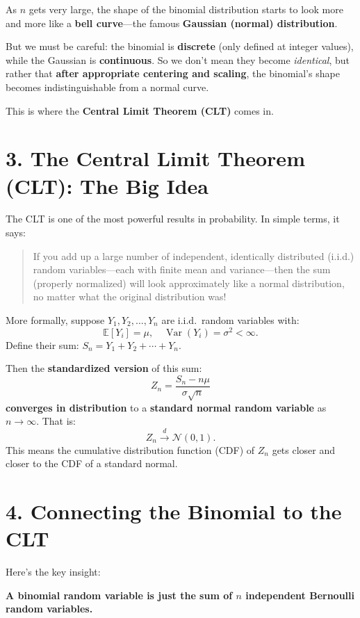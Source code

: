 \documentclass[12pt]{article}
\begin{document}
As $n$ gets very large, the shape of the binomial distribution starts to look more and more like a \textbf{bell curve}—the famous \textbf{Gaussian (normal) distribution}.

But we must be careful: the binomial is \textbf{discrete} (only defined at integer values), while the Gaussian is \textbf{continuous}. So we don’t mean they become \textit{identical}, but rather that \textbf{after appropriate centering and scaling}, the binomial’s shape becomes indistinguishable from a normal curve.

This is where the \textbf{Central Limit Theorem (CLT)} comes in.

\section*{3. The Central Limit Theorem (CLT): The Big Idea}

The CLT is one of the most powerful results in probability. In simple terms, it says:

\begin{quote}
    If you add up a large number of independent, identically distributed (i.i.d.) random variables—each with finite mean and variance—then the sum (properly normalized) will look approximately like a normal distribution, no matter what the original distribution was!
\end{quote}

More formally, suppose $Y_1, Y_2, \dots, Y_n$ are i.i.d.\ random variables with:
\[
\mathbb{E}[Y_i] = \mu, \quad \operatorname{Var}(Y_i) = \sigma^2 < \infty.
\]
Define their sum: $S_n = Y_1 + Y_2 + \cdots + Y_n$.

Then the \textbf{standardized version} of this sum:
\[
Z_n = \frac{S_n - n\mu}{\sigma \sqrt{n}}
\]
\textbf{converges in distribution} to a \textbf{standard normal random variable} as $n \to \infty$. That is:
\[
Z_n \xrightarrow{d} \mathcal{N}(0, 1).
\]
This means the cumulative distribution function (CDF) of $Z_n$ gets closer and closer to the CDF of a standard normal.

\section*{4. Connecting the Binomial to the CLT}

Here’s the key insight:

\begin{center}
    \textbf{A binomial random variable is just the sum of $n$ independent Bernoulli random variables.}
\end{center}
\end{document}

